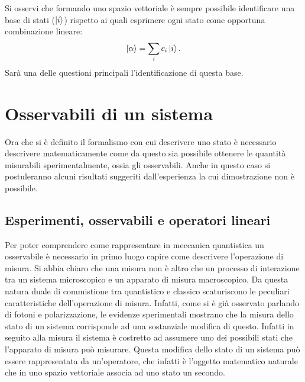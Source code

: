 Si osservi che formando uno spazio vettoriale è sempre possibile identificare una base di stati ($\ket{i}$) rispetto ai quali esprimere ogni stato come opportuna combinazione lineare:
\begin{equation*}
    \ket{\alpha}=\sum_{i} c_i\ket{i}.
\end{equation*}
Sarà una delle questioni principali l'identificazione di questa base.
\section{Osservabili di un sistema}

Ora che si è definito il formalismo con cui descrivere uno stato è necessario descrivere matematicamente come da questo sia possibile ottenere le quantità misurabili sperimentalmente, ossia gli osservabili. Anche in questo caso si postuleranno alcuni risultati suggeriti dall'esperienza la cui dimostrazione non è possibile. 
\subsection{Esperimenti, osservabili e operatori lineari}
Per poter comprendere come rappresentare in meccanica quantistica un osservabile è necessario in primo luogo capire come descrivere l'operazione di misura. Si abbia chiaro che una misura non è altro che un processo di interazione tra un sistema microscopico e un apparato di misura macroscopico. Da questa natura duale di commistione tra quantistico e classico scaturiscono le peculiari caratteristiche dell'operazione di misura. Infatti, come si è già osservato parlando di fotoni e polarizzazione, le evidenze sperimentali mostrano che la misura dello stato di un sistema corrisponde ad una sostanziale modifica di questo. Infatti in seguito alla misura il sistema è costretto ad assumere uno dei possibili stati che l'apparato di misura può misurare. Questa modifica dello stato di un sistema può essere rappresentata da un'operatore, che infatti è l'oggetto matematico naturale che in uno spazio vettoriale associa ad uno stato un secondo.\\ 

